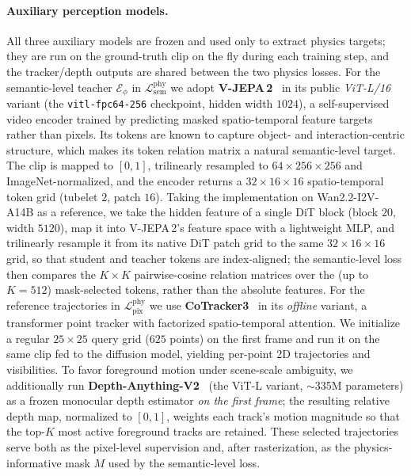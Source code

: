 \paragraph{Auxiliary perception models.}
All three auxiliary models are frozen and used only to extract physics targets;
they are run on the ground-truth clip on the fly during each training step, and
the tracker/depth outputs are shared between the two physics losses. For the
semantic-level teacher $\mathcal{E}_\phi$ in $\mathcal{L}^{\mathrm{phy}}_{\mathrm{sem}}$
we adopt \textbf{V-JEPA\,2}~\cite{bardes2024revisiting} in its public
\emph{ViT-L/16} variant (the \texttt{vitl-fpc64-256} checkpoint, hidden width
$1024$), a self-supervised video encoder trained by predicting masked
spatio-temporal feature targets rather than pixels. Its tokens are known to
capture object- and interaction-centric structure, which makes its token
relation matrix a natural semantic-level target. The clip is mapped to $[0,1]$,
trilinearly resampled to $64{\times}256{\times}256$ and ImageNet-normalized, and
the encoder returns a $32{\times}16{\times}16$ spatio-temporal token grid
(tubelet $2$, patch $16$). Taking the implementation on Wan2.2-I2V-A14B as a reference, we take the
hidden feature of a single DiT block (block $20$, width $5120$), map it into
V-JEPA\,2's feature space with a lightweight MLP, and trilinearly resample it from its native DiT patch grid to
the same $32{\times}16{\times}16$ grid, so that student and teacher tokens are
index-aligned; the semantic-level loss then compares the $K{\times}K$ pairwise-cosine
relation matrices over the (up to $K{=}512$) mask-selected tokens, rather than
the absolute features. For the reference trajectories in
$\mathcal{L}^{\mathrm{phy}}_{\mathrm{pix}}$ we use \textbf{CoTracker3}~\cite{karaev24cotracker3}
in its \emph{offline} variant, a transformer point tracker with factorized
spatio-temporal attention. We initialize a regular $25{\times}25$ query grid
($625$ points) on the first frame and run it on the same clip fed to the
diffusion model, yielding per-point 2D trajectories and visibilities. To favor
foreground motion under scene-scale ambiguity, we additionally run
\textbf{Depth-Anything-V2}~\cite{yang2024depth} (the ViT-L variant,
$\sim$335M parameters) as a frozen monocular depth estimator \emph{on the first
frame}; the resulting relative depth map, normalized to $[0,1]$, weights each
track's motion magnitude so that the top-$K$ most active foreground tracks are
retained. These selected trajectories serve both as the pixel-level supervision
and, after rasterization, as the physics-informative mask $M$ used by the
semantic-level loss.

